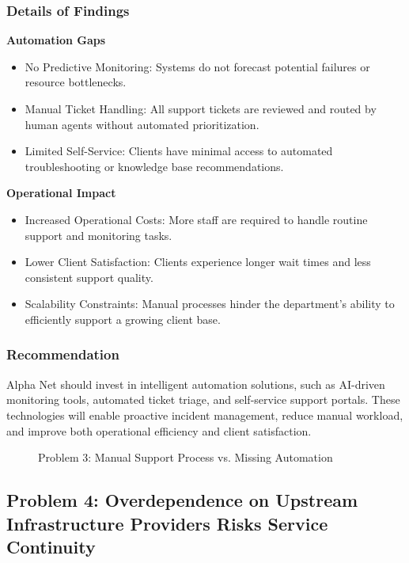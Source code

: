 \subsubsection*{Details of Findings}
\textbf{Automation Gaps}
\begin{itemize}
    \item No Predictive Monitoring: Systems do not forecast potential failures or resource bottlenecks.
    \item Manual Ticket Handling: All support tickets are reviewed and routed by human agents without automated prioritization.
    \item Limited Self-Service: Clients have minimal access to automated troubleshooting or knowledge base recommendations.
\end{itemize}
\textbf{Operational Impact}
\begin{itemize}
    \item Increased Operational Costs: More staff are required to handle routine support and monitoring tasks.
    \item Lower Client Satisfaction: Clients experience longer wait times and less consistent support quality.
    \item Scalability Constraints: Manual processes hinder the department's ability to efficiently support a growing client base.
\end{itemize}

\subsubsection*{Recommendation}
Alpha Net should invest in intelligent automation solutions, such as AI-driven monitoring tools, automated ticket triage, and self-service support portals. These technologies will enable proactive incident management, reduce manual workload, and improve both operational efficiency and client satisfaction.

\begin{figure}[ht]
\centering

\caption{Problem 3: Manual Support Process vs. Missing Automation}
\label{fig:problem3_flowchart}
\end{figure}


\subsection{Problem 4: Overdependence on Upstream Infrastructure Providers Risks Service Continuity}

